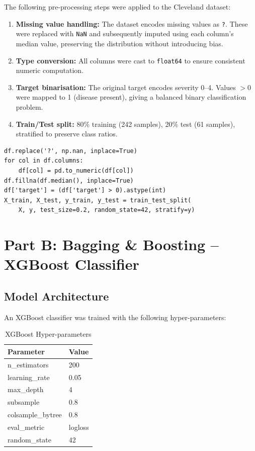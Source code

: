 \documentclass[12pt,a4paper]{article}
\begin{document}
The following pre-processing steps were applied to the Cleveland dataset:

\begin{enumerate}
    \item \textbf{Missing value handling:} The dataset encodes missing values as \texttt{?}. These were replaced with \texttt{NaN} and subsequently imputed using each column's median value, preserving the distribution without introducing bias.
    \item \textbf{Type conversion:} All columns were cast to \texttt{float64} to ensure consistent numeric computation.
    \item \textbf{Target binarisation:} The original target encodes severity 0--4. Values $> 0$ were mapped to 1 (disease present), giving a balanced binary classification problem.
    \item \textbf{Train/Test split:} 80\% training (242 samples), 20\% test (61 samples), stratified to preserve class ratios.
\end{enumerate}

\begin{lstlisting}[caption={Pre-processing code}]
df.replace('?', np.nan, inplace=True)
for col in df.columns:
    df[col] = pd.to_numeric(df[col])
df.fillna(df.median(), inplace=True)
df['target'] = (df['target'] > 0).astype(int)
X_train, X_test, y_train, y_test = train_test_split(
    X, y, test_size=0.2, random_state=42, stratify=y)
\end{lstlisting}

\section{Part B: Bagging \& Boosting -- XGBoost Classifier}

\subsection{Model Architecture}

An XGBoost classifier was trained with the following hyper-parameters:

\begin{table}[H]
\centering
\caption{XGBoost Hyper-parameters}
\begin{tabular}{ll}
\toprule
\textbf{Parameter} & \textbf{Value} \\
\midrule
n\_estimators     & 200 \\
learning\_rate    & 0.05 \\
max\_depth        & 4 \\
subsample         & 0.8 \\
colsample\_bytree & 0.8 \\
eval\_metric      & logloss \\
random\_state     & 42 \\
\bottomrule
\end{tabular}
\end{table}
\end{document}
